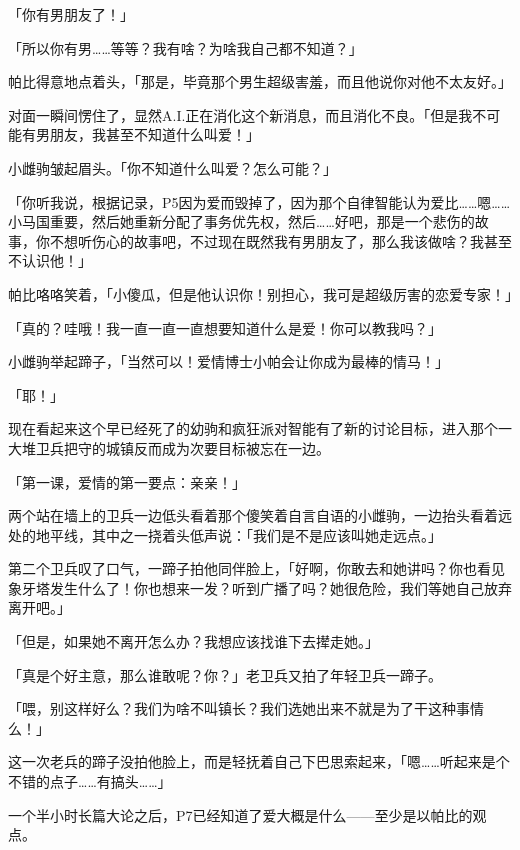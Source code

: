 「你有男朋友了！」

「所以你有男……等等？我有啥？为啥我自己都不知道？」

帕比得意地点着头，「那是，毕竟那个男生超级害羞，而且他说你对他不太友好。」

对面一瞬间愣住了，显然A.I.正在消化这个新消息，而且消化不良。「但是我不可能有男朋友，我甚至不知道什么叫爱！」

小雌驹皱起眉头。「你不知道什么叫爱？怎么可能？」

「你听我说，根据记录，P5因为爱而毁掉了，因为那个自律智能认为爱比……嗯……小马国重要，然后她重新分配了事务优先权，然后……好吧，那是一个悲伤的故事，你不想听伤心的故事吧，不过现在既然我有男朋友了，那么我该做啥？我甚至不认识他！」

帕比咯咯笑着，「小傻瓜，但是他认识你！别担心，我可是超级厉害的恋爱专家！」

「真的？哇哦！我一直一直一直想要知道什么是爱！你可以教我吗？」

小雌驹举起蹄子，「当然可以！爱情博士小帕会让你成为最棒的情马！」

「耶！」

现在看起来这个早已经死了的幼驹和疯狂派对智能有了新的讨论目标，进入那个一大堆卫兵把守的城镇反而成为次要目标被忘在一边。

「第一课，爱情的第一要点：亲亲！」

\horizonline


两个站在墙上的卫兵一边低头看着那个傻笑着自言自语的小雌驹，一边抬头看着远处的地平线，其中之一挠着头低声说：「我们是不是应该叫她走远点。」

第二个卫兵叹了口气，一蹄子拍他同伴脸上，「好啊，你敢去和她讲吗？你也看见象牙塔发生什么了！你也想来一发？听到广播了吗？她很危险，我们等她自己放弃离开吧。」

「但是，如果她不离开怎么办？我想应该找谁下去撵走她。」

「真是个好主意，那么谁敢呢？你？」老卫兵又拍了年轻卫兵一蹄子。

「喂，别这样好么？我们为啥不叫镇长？我们选她出来不就是为了干这种事情么！」

这一次老兵的蹄子没拍他脸上，而是轻抚着自己下巴思索起来，「嗯……听起来是个不错的点子……有搞头……」

\horizonline


一个半小时长篇大论之后，P7已经知道了爱大概是什么——至少是以帕比的观点。


